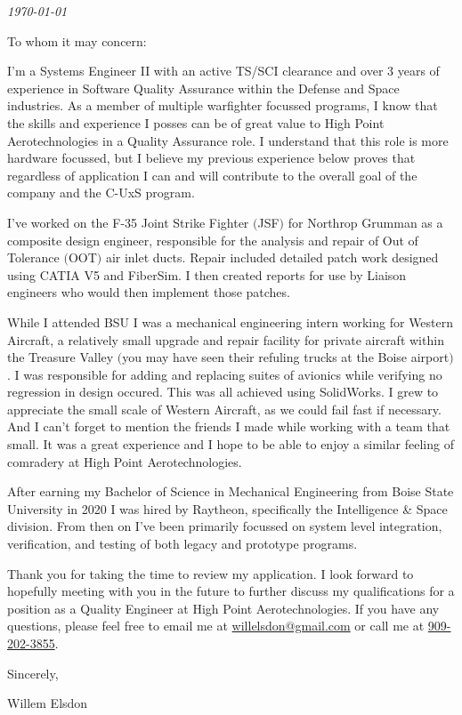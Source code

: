 \documentclass{ExpressiveCoverLetter}
\begin{document}
\coverletterheader[
    firstname=Willem,
    middleinitial=N,
    lastname=Elsdon,
    email=willelsdon@gmail.com,
    phone=909-202-3855,
    city=Boise,
    state=Idaho
]

\vspace{0.05in}
\emph{\today}
\vspace{0.15in}


To whom it may concern:

I'm a Systems Engineer II with an active TS/SCI clearance and over 3 years of experience in Software
Quality Assurance within the Defense and Space industries. As a member
of multiple warfighter focussed programs, I know that
the skills and experience I posses can be of great value to High Point
Aerotechnologies in a Quality Assurance role. I understand that this
role is more hardware focussed, but I believe my previous experience
below proves that regardless of application I can and will contribute to
the overall goal of the company and the C-UxS program.

I've worked on the F-35 Joint Strike Fighter $($JSF$)$ for Northrop
Grumman as a composite design engineer, responsible for the analysis and
repair of
Out of Tolerance $($OOT$)$ air inlet ducts. Repair included detailed
patch work designed using CATIA V5 and FiberSim. I then created reports
for use by Liaison engineers who would then implement those patches.

While I attended BSU I was a mechanical engineering intern working for
Western Aircraft, a relatively small upgrade and repair facility for
private aircraft within the Treasure Valley $($you may have seen their
refuling trucks at the Boise airport$)$. I was responsible for
adding and replacing suites of avionics while verifying no regression in
design occured. This was all achieved using SolidWorks. I grew to
appreciate the small scale of Western Aircraft, as we could fail fast if necessary.
And I can't forget to mention the friends I made while working with a team that small.
It was a great experience and I hope to be able to enjoy a similar
feeling of comradery at High Point Aerotechnologies.

After earning my Bachelor of Science in Mechanical Engineering from
Boise State University in 2020 I was hired by Raytheon, specifically the
Intelligence \& Space division. From then on I've been primarily focussed
on system level integration, verification, and testing of both legacy
and prototype programs.

Thank you for taking the time to review my application. I look forward
to hopefully meeting with you in the future to further discuss my
qualifications for a position as a Quality Engineer at High Point Aerotechnologies.
If you have any questions, please feel free to
email me at \href{mailto:willelsdon@gmail.com}{willelsdon@gmail.com} or
call me at \href{tel:+1-909-202-3855}{909-202-3855}.

Sincerely,

\vspace{0.15in}

Willem Elsdon
\end{document}
